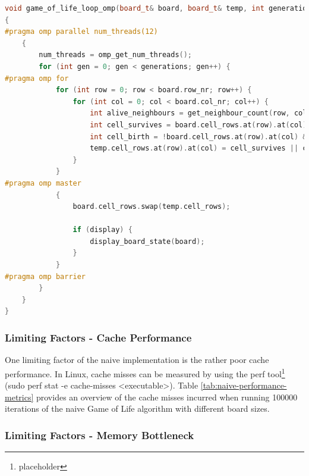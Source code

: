 \documentclass[a4paper,english,12pt,twoside=false]{scrartcl} %
\begin{document}
\begin{lstlisting}[caption={Parallel Naive State Generation Algorithm},label={lst:gol-parallel-naive-generation-algorithm},language=C++]
void game_of_life_loop_omp(board_t& board, board_t& temp, int generations, int display)
{
#pragma omp parallel num_threads(12)
    {
        num_threads = omp_get_num_threads();
        for (int gen = 0; gen < generations; gen++) {
#pragma omp for
            for (int row = 0; row < board.row_nr; row++) {
                for (int col = 0; col < board.col_nr; col++) {
                    int alive_neighbours = get_neighbour_count(row, col, board);
                    int cell_survives = board.cell_rows.at(row).at(col) && (alive_neighbours == 2 || alive_neighbours == 3);
                    int cell_birth = !board.cell_rows.at(row).at(col) && (alive_neighbours == 3);
                    temp.cell_rows.at(row).at(col) = cell_survives || cell_birth;
                }
            }
#pragma omp master
            {
                board.cell_rows.swap(temp.cell_rows);

                if (display) {
                    display_board_state(board);
                }
            }
#pragma omp barrier
        }
    }
}
\end{lstlisting}

\subsubsection{Limiting Factors - Cache Performance}

One limiting factor of the naive implementation is the rather poor cache performance. In Linux, cache misses can be measured by using the perf tool\footnote{placeholder} (sudo perf stat -e cache-misses <executable>). Table \ref{tab:naive-performance-metrics} provides an overview of the cache misses incurred when running 100000 iterations of the naive Game of Life algorithm with different board sizes.

\subsubsection{Limiting Factors - Memory Bottleneck}
\end{document}
